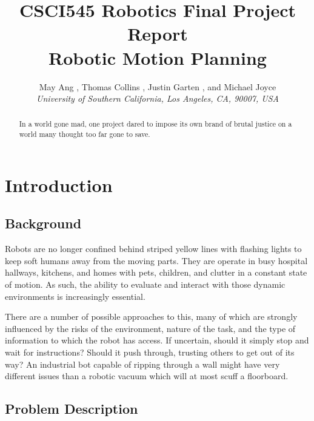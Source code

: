 \documentclass{aiaa-tc}%
\begin{document}
\title{CSCI545 Robotics Final Project Report\\
	Robotic Motion Planning}

 \author
{		May Ang%
		\hspace{3pt},
		Thomas Collins%
		\hspace{3pt},
		Justin Garten%
		\hspace{3pt},
		and Michael Joyce%
		\\
		\normalsize\itshape
		University of Southern California, Los Angeles, CA, 90007, USA\\
}
\maketitle

\begin{abstract}
In a world gone mad, one project dared to impose its own brand of
brutal justice on a world many thought too far gone to save.
\end{abstract}

\section{Introduction}
\label{Introduction}

\subsection{Background}

Robots are no longer confined behind striped yellow lines
with flashing lights to keep soft humans away from the moving
parts. They are operate in busy hospital hallways, kitchens, and homes
with pets, children, and clutter in a constant state of motion. As
such, the ability to evaluate and interact with those dynamic environments is
increasingly essential.

There are a number of possible approaches to this, many of which are
strongly influenced by the risks of the environment, nature of the
task, and the type of information to which the robot has
access. If uncertain, should it simply stop and wait for instructions?
Should it push through, trusting others to get out of its way? An
industrial bot capable of ripping through a wall might have very
different issues than a robotic vacuum which will at most scuff a
floorboard.

\subsection{Problem Description}
\end{document}
